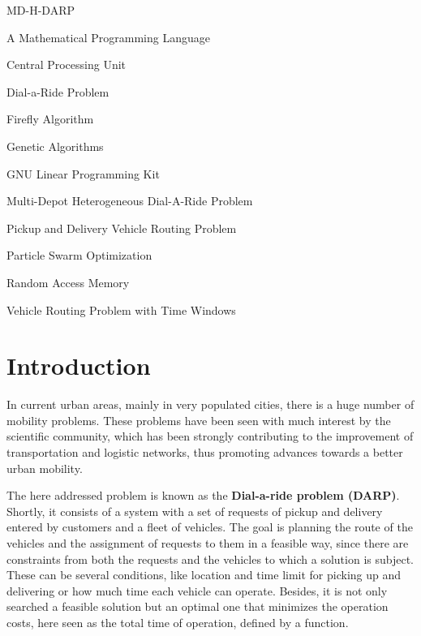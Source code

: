 \documentclass[tuberlin,cic,tc,openright,english,noabntcite,oneside]{iiufrgs}
\begin{document}
\begin{listofabbrv}{MD-H-DARP}
	\item[AMPL] A Mathematical Programming Language
	\item[CPU] Central Processing Unit
    \item[DARP] Dial-a-Ride Problem
    \item[FA] Firefly Algorithm
    \item[GA] Genetic Algorithms
    \item[GLPK] GNU Linear Programming Kit
    \item[MD-H-DARP] Multi-Depot Heterogeneous Dial-A-Ride Problem
    \item[PDVRP] Pickup and Delivery Vehicle Routing Problem
    \item[PSO] Particle Swarm Optimization
    \item[RAM] Random Access Memory
    \item[VRPTW] Vehicle Routing Problem with Time Windows
\end{listofabbrv}


\tableofcontents


\chapter{Introduction}
In current urban areas, mainly in very populated cities, there is a huge number of mobility problems. These problems have been seen with much interest by the scientific community, which has been strongly contributing to the improvement of transportation and logistic networks, thus promoting advances towards a better urban mobility.

The here addressed problem is known as the \textbf{Dial-a-ride problem (DARP)}. Shortly, it consists of a system with a set of requests of pickup and delivery entered by customers and a fleet of vehicles. The goal is planning the route of the vehicles and the assignment of requests to them in a feasible way, since there are constraints from both the requests and the vehicles to which a solution is subject. These can be several conditions, like location and time limit for picking up and delivering or how much time each vehicle can operate. Besides, it is not only searched a feasible solution but an optimal one that minimizes the operation costs, here seen as the total time of operation, defined by a function.
\end{document}
